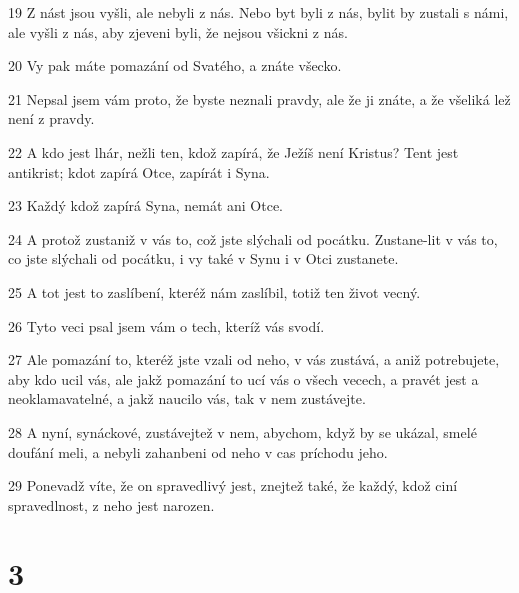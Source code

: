 \par 19 Z nást jsou vyšli, ale nebyli z nás. Nebo byt byli z nás, bylit by zustali s námi, ale vyšli z nás, aby zjeveni byli, že nejsou všickni z nás.
\par 20 Vy pak máte pomazání od Svatého, a znáte všecko.
\par 21 Nepsal jsem vám proto, že byste neznali pravdy, ale že ji znáte, a že všeliká lež není z pravdy.
\par 22 A kdo jest lhár, nežli ten, kdož zapírá, že Ježíš není Kristus? Tent jest antikrist; kdot zapírá Otce, zapírát i Syna.
\par 23 Každý kdož zapírá Syna, nemát ani Otce.
\par 24 A protož zustaniž v vás to, což jste slýchali od pocátku. Zustane-lit v vás to, co jste slýchali od pocátku, i vy také v Synu i v Otci zustanete.
\par 25 A tot jest to zaslíbení, kteréž nám zaslíbil, totiž ten život vecný.
\par 26 Tyto veci psal jsem vám o tech, kteríž vás svodí.
\par 27 Ale pomazání to, kteréž jste vzali od neho, v vás zustává, a aniž potrebujete, aby kdo ucil vás, ale jakž pomazání to ucí vás o všech vecech, a pravét jest a neoklamavatelné, a jakž naucilo vás, tak v nem zustávejte.
\par 28 A nyní, synáckové, zustávejtež v nem, abychom, když by se ukázal, smelé doufání meli, a nebyli zahanbeni od neho v cas príchodu jeho.
\par 29 Ponevadž víte, že on spravedlivý jest, znejtež také, že každý, kdož ciní spravedlnost, z neho jest narozen.

\chapter{3}

